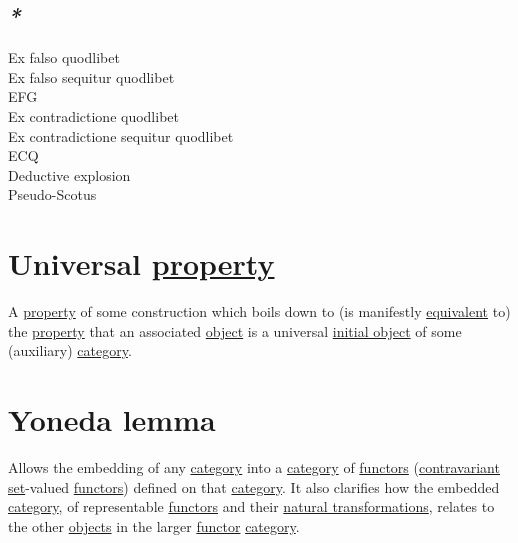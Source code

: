 \documentclass[a4paper,14pt,oneside]{book}
\begin{document}
\section{\emph{*}}
\label{sec:org3f9657f}

\label{org0bfd64c}Ex falso quodlibet\\
\label{org00a75fe}Ex falso sequitur quodlibet\\
\label{org015bece}EFG\\
\label{org269a7f3}Ex contradictione quodlibet\\
\label{orgf6e689d}Ex contradictione sequitur quodlibet\\
\label{orga06abb8}ECQ\\
\label{org661f17c}Deductive explosion\\
\label{orgf14d5a0}Pseudo-Scotus\\

\chapter{Universal \hyperref[org91a1c9f]{property}}
\label{sec:org69c3506}

A \hyperref[org91a1c9f]{property} of some construction which boils down to (is manifestly \hyperref[orgf83400f]{equivalent} to) the \hyperref[org91a1c9f]{property} that an associated \hyperref[org5771609]{object} is a universal \hyperref[org44a2914]{initial object} of some (auxiliary) \hyperref[org841d8bc]{category}.\\

\chapter{Yoneda lemma}
\label{sec:orgf44d4d2}

Allows the embedding of any \hyperref[org841d8bc]{category} into a \hyperref[org841d8bc]{category} of \hyperref[orgcde2498]{functors} (\hyperref[org375eb52]{contravariant} \hyperref[orge119629]{set}-valued \hyperref[orgcde2498]{functors}) defined on that \hyperref[org841d8bc]{category}. It also clarifies how the embedded \hyperref[org841d8bc]{category}, of representable \hyperref[orgcde2498]{functors} and their \hyperref[orge1003d4]{natural transformations}, relates to the other \hyperref[org22f7883]{objects} in the larger \hyperref[orge5e236e]{functor} \hyperref[org841d8bc]{category}.\\
\end{document}
